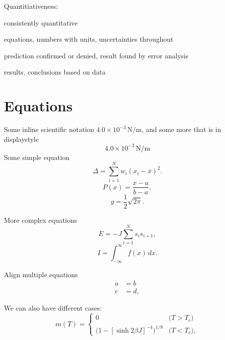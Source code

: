 \documentclass[
    10pt,aps,prl,
    amsfonts,
    amssymb,
    amsmath,
    runinaddress,
    secnum,
    showkeys,
    superscriptaddress,
    twocolumn,
]{revtex4}
\begin{document}
    Quantitiativeness:
    \begin{itemize*}
        \item consistently quantitative
        \item equations, numbers with units, uncertainties throughout
        \item prediction confirmed or denied, result found by error analysis
        \item results, conclusions based on data
    \end{itemize*}



\section{Equations}
Some  inline scientific notation $4.0\times 10^{-3}\,\mathrm{N/m}$,
    and some more that is in displaystyle
\begin{equation}
    4.0\times 10^{-3}\,\mathrm{N/m}
\end{equation}
Some simple equation
\begin{equation}
    \Delta =\sum_{i=1}^N w_i (x_i - \bar{x})^2.
\end{equation}
\begin{equation}
    P(x) = \frac{x - a}{b - a}, \nonumber
\end{equation}
\begin{equation}
    g = \frac{1}{2} \sqrt{2\pi}. \nonumber
\end{equation}

More complex equations
\begin{equation}
    \label{eq:ising}
    E = -J \sum_{i=1}^N s_i s_{i+1},
\end{equation}
\begin{equation}
    I = \! \int_{-\infty}^\infty f(x)\,dx \label{eq:fine}.
\end{equation}

Align multiple equations
\begin{align}
    a & = b \\
    c &= d,
\end{align}

We can also have different cases:
\begin{equation}
\label{eq:mdiv}
m(T) =
\begin{cases}
0 & \text{($T > T_c$)} \\
\big(1 - [\sinh 2 \beta J]^{-4} \big)^{\! 1/8} & \text{($T < T_c$)},
\end{cases}
\end{equation}
\end{document}
